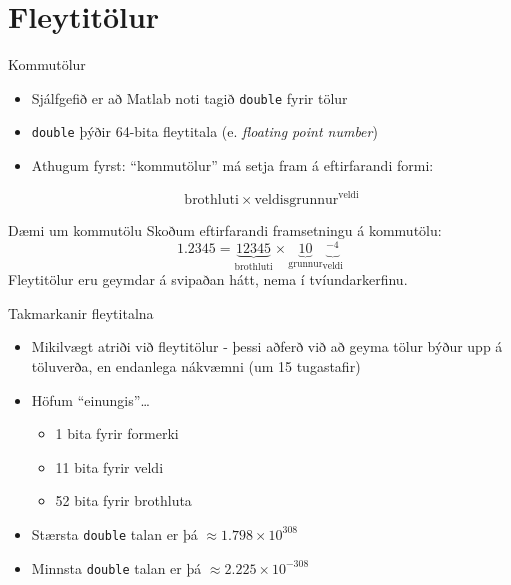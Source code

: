 \documentclass{beamer}
\begin{document}
\section{Fleytitölur}

\begin{frame}{Kommutölur}
\begin{itemize}
 \item Sjálfgefið er að Matlab noti tagið \texttt{double} fyrir tölur
 \item \texttt{double} þýðir 64-bita fleytitala (e. \emph{floating point number})
 \item Athugum fyrst: ``kommutölur'' má setja fram á eftirfarandi formi:

 \[
 \text{brothluti} \times \text{veldisgrunnur}^\text{veldi}
\]
\end{itemize}
\end{frame}

\begin{frame}{Dæmi um kommutölu}
Skoðum eftirfarandi framsetningu á kommutölu:
 \[
1.2345 = \underbrace{12345}_\text{brothluti} \times \underbrace{10}_\text{grunnur}\underbrace{{}^{-4}}_\text{veldi}
\]
Fleytitölur eru geymdar á svipaðan hátt, nema í tvíundarkerfinu.
\end{frame}

\begin{frame}{Takmarkanir fleytitalna}
\begin{itemize}
 \item Mikilvægt atriði við fleytitölur - þessi aðferð við að geyma tölur býður upp á töluverða, en endanlega nákvæmni (um 15 tugastafir)
 \item Höfum ``einungis''\ldots
 \begin{itemize}
  \item 1 bita fyrir formerki
  \item 11 bita fyrir veldi
  \item 52 bita fyrir brothluta
 \end{itemize}
 \item Stærsta \texttt{double} talan er þá $\approx 1.798 \times 10^{308}$
 \item Minnsta \texttt{double} talan er þá $\approx 2.225 \times 10^{-308}$
\end{itemize}
\end{frame}
\end{document}
